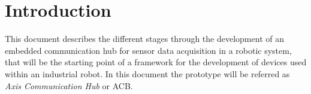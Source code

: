 \chapter{Introduction}
%
%  
%
%


This document describes the different stages through the development of an embedded communication hub for sensor
data acquisition in a robotic system, that will be the starting point of a framework for the development of 
devices used within an industrial robot. In this document the prototype will be referred as \emph{Axis Communication Hub} or ACB. 

